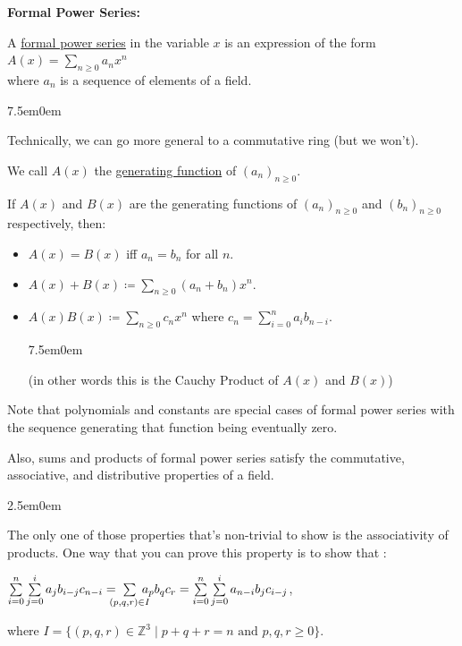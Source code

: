 \documentclass{book}
\newcommand{\myComment}{%
   \color{RawerSienna}%
   \fontsize{12}{14}\selectfont%
}
\newcommand{\teachComment}{
   \color{Orange}%
   \fontsize{12}{14}\selectfont%
}
\newenvironment{myIndent}{%
   \begin{adjustwidth}{2.5em}{0em}%
}{%
   \end{adjustwidth}%
}
\newenvironment{myTindent}{%
   \begin{adjustwidth}{7.5em}{0em}%
}{%
   \end{adjustwidth}%
}
\newcommand{\udefine}[1]{{%
   \setulcolor{Red}%
   \setul{0.14em}{0.07em}%
   \ul{#1}%
}}
\newcommand{\blab}[1]{\textbf{#1}}
\newcommand{\retTwo}{\hfill\bigbreak}
\begin{document}
\blab{Formal Power Series:}

A \udefine{formal power series} in the variable $x$ is an expression of the form $A(x) = \sum\limits_{n \geq 0} a_n x^n$\\ [-8pt] where $a_n$ is a sequence of elements of a field.

\begin{myTindent}\teachComment
   Technically, we can go more general to a commutative ring (but we won't).\retTwo
\end{myTindent}

We call $A(x)$ the \udefine{generating function} of $(a_n)_{n \geq 0}$.\retTwo

If $A(x)$ and $B(x)$ are the generating functions of $(a_n)_{n \geq 0}$ and $(b_n)_{n \geq 0}$ respectively, then:
\begin{itemize}
   \item $A(x) = B(x)$ iff $a_n = b_n$ for all $n$.
   \item $A(x) + B(x) \coloneq \sum\limits_{n \geq 0}(a_n + b_n)x^n$.\\ [-16pt]
   \item $A(x)B(x) \coloneq \sum\limits_{n \geq 0}c_nx^n$ where $c_n = \sum\limits_{i = 0}^n a_ib_{n-i}$.\\ [-12pt]
    
    \begin{myTindent}\myComment
      (in other words this is the Cauchy Product of $A(x)$ and $B(x)$)\retTwo
    \end{myTindent}
\end{itemize}

Note that polynomials and constants are special cases of formal power series with the sequence generating that function being eventually zero.\retTwo

Also, sums and products of formal power series satisfy the commutative, associative, and distributive properties of a field.

\begin{myIndent}\myComment
   The only one of those properties that's non-trivial to show is the associativity of products. One way that you can prove this property is to show that :

   {\center $\sum\limits_{i = 0}^n \sum\limits_{j = 0}^i a_jb_{i-j}c_{n-i} = \hspace{-0.8em}\sum\limits_{(p, q, r) \in I}\hspace{-0.8em}a_p b_q c_r = \sum\limits_{i = 0}^n \sum\limits_{j = 0}^i a_{n-i}b_{j}c_{i - j}$,\par}

   where $I = \{(p, q, r) \in \mathbb{Z}^3 \mid p + q + r = n \text{ and } p, q, r \geq 0\}$.\newpage
\end{myIndent}
\end{document}
